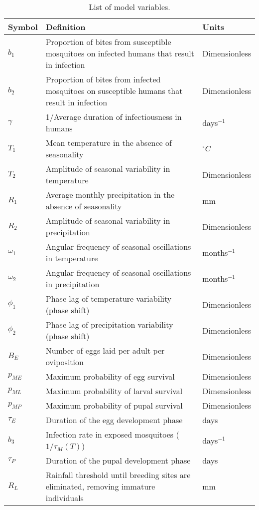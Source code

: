 \documentclass[a4paper,fleqn]{cas-dc}
\begin{document}
\begin{table}[width=2.0\linewidth,cols=3,pos=h]
\caption{List of model variables.}\label{tbl2}
\renewcommand{\thetable}{Appendix 2}  %
\begin{tabular*}{\tblwidth}{@{} LLL@{} }
\toprule
Symbol & Definition & Units \\
\midrule
$b_1$  & Proportion of bites from susceptible mosquitoes on infected humans that result in infection & Dimensionless \\
$b_2$   & Proportion of bites from infected mosquitoes on susceptible humans that result in infection & Dimensionless \\
$\gamma$ &  1/Average duration of infectiousness in humans & days$^{-1}$  \\
$T_1$  & Mean temperature in the absence of seasonality & $^\circ C$ \\ 
$T_2$  & Amplitude of seasonal variability in temperature & Dimensionless \\ 
$R_1$  & Average monthly precipitation in the absence of seasonality & mm \\ 
$R_2$  & Amplitude of seasonal variability in precipitation & Dimensionless \\ 
$\omega_1$  & Angular frequency of seasonal oscillations in temperature & months$^{-1}$ \\ 
$\omega_2$  & Angular frequency of seasonal oscillations in precipitation & months$^{-1}$ \\ 
$\phi_1$  & Phase lag of temperature variability (phase shift) & Dimensionless \\ 
$\phi_2$  & Phase lag of precipitation variability (phase shift) & Dimensionless \\ 
$B_E$  & Number of eggs laid per adult per oviposition & Dimensionless \\ 
$p_{ME}$  & Maximum probability of egg survival & Dimensionless \\ 
$p_{ML}$  & Maximum probability of larval survival & Dimensionless \\ 
$p_{MP}$  & Maximum probability of pupal survival & Dimensionless \\ 
$\tau_E$  & Duration of the egg development phase & days \\ 
$b_3$  & Infection rate in exposed mosquitoes ($1/\tau_M(T)$) &  days$^{-1}$ \\ 
$\tau_P$  & Duration of the pupal development phase & days \\ 
$R_L$  & Rainfall threshold until breeding sites are eliminated, removing immature individuals & mm \\ 

\end{tabular*}
\end{table}
\end{document}
